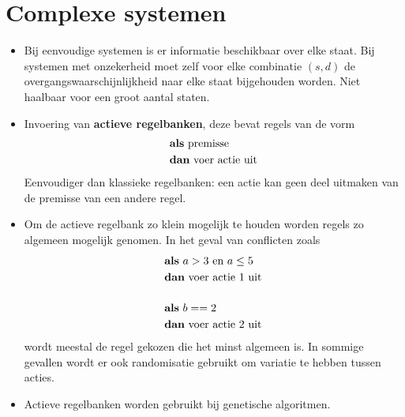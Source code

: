 \section{Complexe systemen}
\begin{itemize}
	\item Bij eenvoudige systemen is er informatie beschikbaar over elke staat. Bij systemen met onzekerheid moet zelf voor elke combinatie $(s, d)$ de overgangswaarschijnlijkheid naar elke staat bijgehouden worden.
	\alert Niet haalbaar voor een groot aantal staten.
	\item Invoering van \textbf{actieve regelbanken}, deze bevat regels van de vorm
			\begin{equation*}
				\begin{split}
				& \hbox{\textbf{als} premisse} \\
				& \hbox{\textbf{dan} voer actie uit} 
				\end{split}
			\end{equation*}
	\good Eenvoudiger dan klassieke regelbanken: een actie kan geen deel uitmaken van de premisse van een andere regel.
	\item Om de actieve regelbank zo klein mogelijk te houden worden regels zo algemeen mogelijk genomen. In het geval van conflicten zoals
				\begin{equation*}
					\begin{split}
					& \hbox{\textbf{als} } a > 3 \hbox{ en } a \leq 5 \\
					& \hbox{\textbf{dan} voer actie 1 uit} 
					 \\[3ex]
					& \hbox{\textbf{als} } b == 2 \\
					& \hbox{\textbf{dan} voer actie 2 uit} \\
					\end{split}
				\end{equation*}
	wordt meestal de regel gekozen die het minst algemeen is. In sommige gevallen wordt er ook randomisatie gebruikt om variatie te hebben tussen acties.
	\item Actieve regelbanken worden gebruikt bij genetische algoritmen.
\end{itemize}

